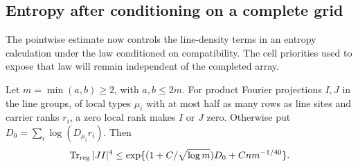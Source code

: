 \subsection{Entropy after conditioning on a complete grid}

The pointwise estimate now controls the line-density terms in an
entropy calculation under the law conditioned on compatibility.
The cell priorities used to expose that law will remain independent
of the completed array.

\begin{lemma}\label{rec:smoothed-grid-fourth}
Let $m=\min(a,b)\ge2$, with $a,b\le2m$. For product Fourier projections $I,J$ in the line groups, of local
types $\mu_i$ with at most half as many rows as line sites and carrier
ranks $r_i$, a zero local rank makes $I$ or $J$ zero. Otherwise put
$D_0=\sum_i\log(D_{\mu_i}r_i)$. Then
\[
 \operatorname{Tr}_{\mathrm{reg}}|JI|^4
 \le\exp\{(1+C/\sqrt{\log m})D_0+Cn m^{-1/40}\}.
\]
\end{lemma}
